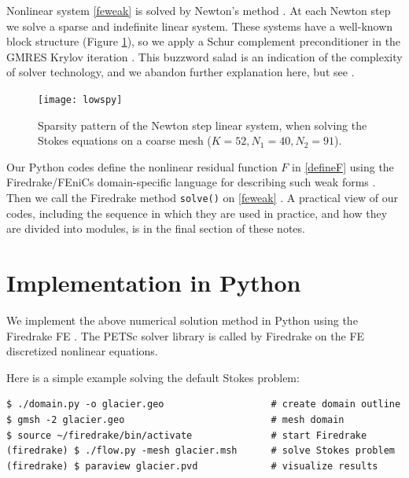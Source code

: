 \documentclass[letterpaper,final,12pt,reqno]{amsart}
\begin{document}
Nonlinear system \eqref{feweak} is solved by Newton's method \cite{Bueler2021,Kelley2003}.  At each Newton step we solve a sparse and indefinite linear system.  These systems have a well-known block structure (Figure \ref{fig:lowspy}), so we apply a Schur complement preconditioner in the GMRES Krylov iteration \cite{Elmanetal2014,GolubVanLoan2013}.  This buzzword salad is an indication of the complexity of solver technology, and we abandon further explanation here, but see \cite[Chapter 14]{Bueler2021}.

\begin{figure}[h]
\texttt{[image: lowspy]}
\caption{Sparsity pattern of the Newton step linear system, when solving the Stokes equations on a coarse mesh ($K=52,N_1=40,N_2=91$).}
\label{fig:lowspy}
\end{figure}

Our Python codes define the nonlinear residual function $F$ in \eqref{defineF} using the Firedrake/FEniCs domain-specific language for describing such weak forms \cite{Alnaesetal2014}.  Then we call the Firedrake method \texttt{solve()} on \eqref{feweak} \cite{Rathgeberetal2016}.  A practical view of our codes, including the sequence in which they are used in practice, and how they are divided into modules, is in the final section of these notes.


\section{Implementation in Python} \label{sec:implementation}

We implement the above numerical solution method in Python using the Firedrake FE \cite{Rathgeberetal2016}.  The PETSc solver library \cite{Balayetal2018,Bueler2021} is called by Firedrake on the FE discretized nonlinear equations.

Here is a simple example solving the default Stokes problem:

\medskip
\begin{Verbatim}
$ ./domain.py -o glacier.geo                   # create domain outline
$ gmsh -2 glacier.geo                          # mesh domain
$ source ~/firedrake/bin/activate              # start Firedrake
(firedrake) $ ./flow.py -mesh glacier.msh      # solve Stokes problem
(firedrake) $ paraview glacier.pvd             # visualize results
\end{Verbatim}
\end{document}
